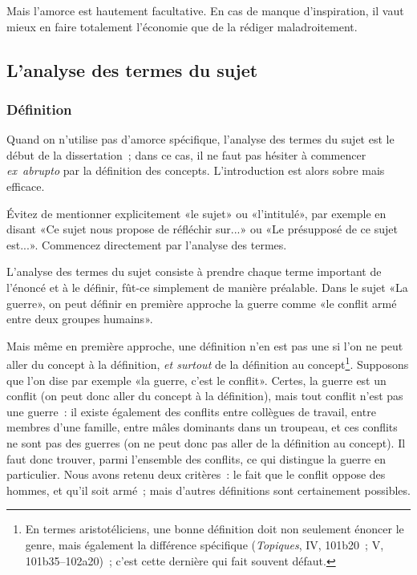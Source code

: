 \documentclass[a4paper,11pt]{article}
\begin{document}
\par

Mais l'amorce est hautement facultative. En cas de manque d'inspiration,
il vaut mieux en faire totalement l'économie que de la rédiger
maladroitement.



\subsection{L'analyse des termes du sujet}

\subsubsection{Définition}

Quand on n'utilise pas d'amorce spécifique, l'analyse des termes du
sujet est le début de la dissertation~; dans ce cas, il ne faut pas
hésiter à commencer \emph{ex~abrupto} par la définition des
concepts. L'introduction est alors sobre mais efficace.

\par

Évitez de mentionner explicitement «le sujet» ou «l'intitulé», par
exemple en disant «Ce sujet nous propose de réfléchir sur...» ou «Le
présupposé de ce sujet est...». Commencez directement par l'analyse des
termes.

\par

L'analyse des termes du sujet consiste à prendre chaque terme important
de l'énoncé et à le définir, fût-ce simplement de manière
préalable. Dans le sujet «La guerre», on peut définir en première
approche la guerre comme «le conflit armé entre deux groupes humains».

\par

Mais même en première approche, une définition n'en est pas une si l'on
ne peut aller du concept à la définition, \emph{et surtout} de la
définition au concept\footnote{En termes aristotéliciens, une bonne
  définition doit non seulement énoncer le genre, mais également la
  différence spécifique (\emph{Topiques}, IV, 101b20~; V,
  101b35--102a20)~; c'est cette dernière qui fait souvent défaut.}.
Supposons que l'on dise par exemple «la guerre, c'est le conflit».
Certes, la guerre est un conflit (on peut donc aller du concept à la
définition), mais tout conflit n'est pas une guerre~: il existe
également des conflits entre collègues de travail, entre membres d'une
famille, entre mâles dominants dans un troupeau, et ces conflits ne sont
pas des guerres (on ne peut donc pas aller de la définition au concept).
Il faut donc trouver, parmi l'ensemble des conflits, ce qui distingue la
guerre en particulier. Nous avons retenu deux critères~: le fait que le
conflit oppose des hommes, et qu'il soit armé~; mais d'autres
définitions sont certainement possibles.
\end{document}
